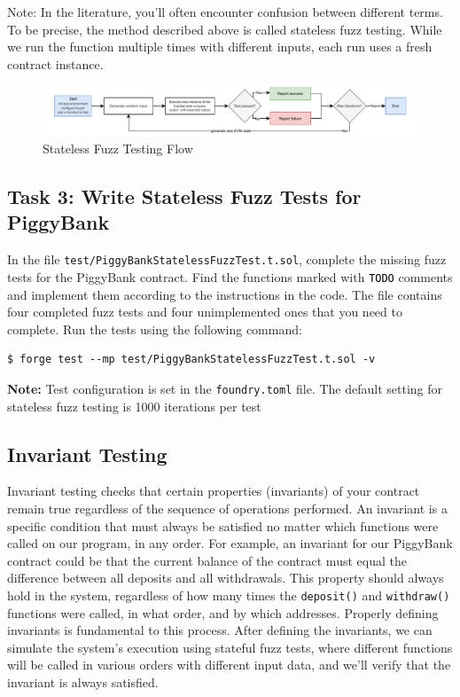 \documentclass[12pt]{article}
\newcommand{\codegrey}[1]{%
  \texttt{\colorbox{black!4}{\textcolor{black}{#1}}}%
}
\begin{document}
\noindent
Note: In the literature, you'll often encounter confusion between different terms. To be precise, the method described above is called stateless fuzz testing. While we run the function multiple times with different inputs, each run uses a fresh contract instance.

\begin{figure}[h!]
    \centering
    \includegraphics[width=1\textwidth]{fuzz-testing.pdf}
    \caption{Stateless Fuzz Testing Flow}\label{fig:fuzz-testing}
\end{figure}

\subsection*{Task 3: Write Stateless Fuzz Tests for PiggyBank}

In the file \texttt{test/PiggyBankStatelessFuzzTest.t.sol}, complete the
missing fuzz tests for the PiggyBank contract. Find the functions marked with
\codegrey{TODO} comments and implement them according to the instructions in
the code. The file contains four completed fuzz tests and four unimplemented
ones that you need to complete. Run the tests using the following command:

\noindent \begin{minipage}{\textwidth}
    \begin{verbatim}
$ forge test --mp test/PiggyBankStatelessFuzzTest.t.sol -v
\end{verbatim}
\end{minipage}

\noindent
\textbf{Note:} Test configuration is set in the \texttt{foundry.toml} file. The default setting for stateless fuzz testing is 1000 iterations per test

\subsection{Invariant Testing}

Invariant testing checks that certain properties (invariants) of your contract
remain true regardless of the sequence of operations performed. An invariant is
a specific condition that must always be satisfied no matter which functions
were called on our program, in any order. For example, an invariant for our
PiggyBank contract could be that the current balance of the contract must equal
the difference between all deposits and all withdrawals. This property should
always hold in the system, regardless of how many times the \texttt{deposit()}
and \texttt{withdraw()} functions were called, in what order, and by which
addresses. Properly defining invariants is fundamental to this process. After
defining the invariants, we can simulate the system's execution using stateful
fuzz tests, where different functions will be called in various orders with
different input data, and we'll verify that the invariant is always satisfied.
\end{document}
